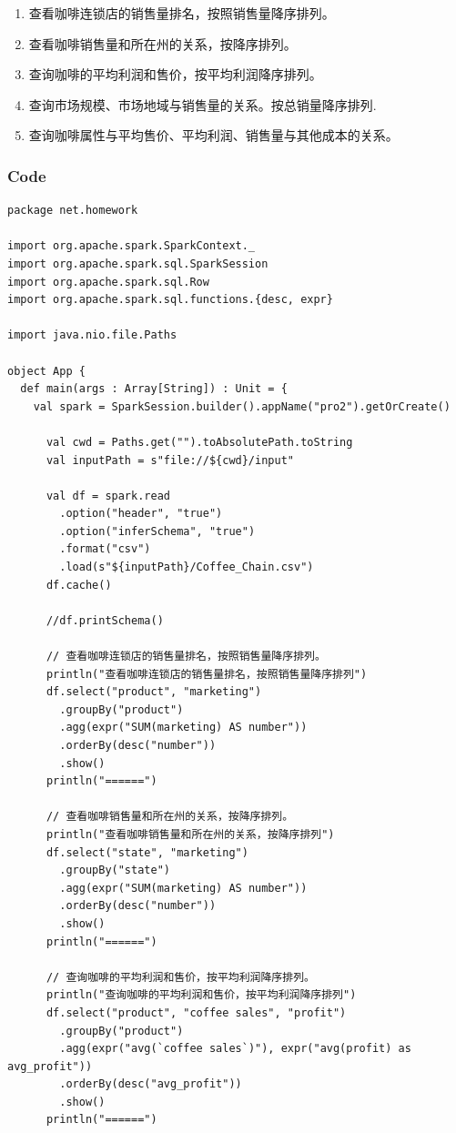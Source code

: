 \documentclass{article}
\begin{document}
\begin{enumerate}
  \item 查看咖啡连锁店的销售量排名，按照销售量降序排列。
  \item 查看咖啡销售量和所在州的关系，按降序排列。
  \item 查询咖啡的平均利润和售价，按平均利润降序排列。
  \item 查询市场规模、市场地域与销售量的关系。按总销量降序排列.
  \item 查询咖啡属性与平均售价、平均利润、销售量与其他成本的关系。
\end{enumerate}

\subsubsection{Code}
\begin{center}
\begin{verbatim}
package net.homework

import org.apache.spark.SparkContext._
import org.apache.spark.sql.SparkSession
import org.apache.spark.sql.Row
import org.apache.spark.sql.functions.{desc, expr}

import java.nio.file.Paths

object App {
  def main(args : Array[String]) : Unit = {
    val spark = SparkSession.builder().appName("pro2").getOrCreate()

      val cwd = Paths.get("").toAbsolutePath.toString
      val inputPath = s"file://${cwd}/input"

      val df = spark.read
        .option("header", "true")
        .option("inferSchema", "true")
        .format("csv")
        .load(s"${inputPath}/Coffee_Chain.csv")
      df.cache()

      //df.printSchema()

      // 查看咖啡连锁店的销售量排名，按照销售量降序排列。
      println("查看咖啡连锁店的销售量排名，按照销售量降序排列")
      df.select("product", "marketing")
        .groupBy("product")
        .agg(expr("SUM(marketing) AS number"))
        .orderBy(desc("number"))
        .show()
      println("======")

      // 查看咖啡销售量和所在州的关系，按降序排列。
      println("查看咖啡销售量和所在州的关系，按降序排列")
      df.select("state", "marketing")
        .groupBy("state")
        .agg(expr("SUM(marketing) AS number"))
        .orderBy(desc("number"))
        .show()
      println("======")

      // 查询咖啡的平均利润和售价，按平均利润降序排列。
      println("查询咖啡的平均利润和售价，按平均利润降序排列")
      df.select("product", "coffee sales", "profit")
        .groupBy("product")
        .agg(expr("avg(`coffee sales`)"), expr("avg(profit) as avg_profit"))
        .orderBy(desc("avg_profit"))
        .show()
      println("======")


\end{verbatim}
\end{center}
\end{document}
